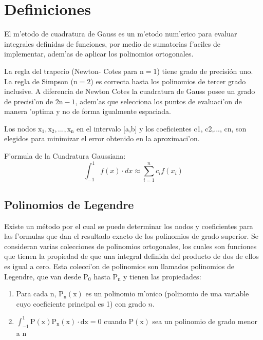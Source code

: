 \documentclass{article}
\begin{document}
		\section*{Definiciones}
			\large{
				El m'etodo de cuadratura de Gauss es un m'etodo num'erico para evaluar integrales definidas de funciones, por medio de sumatorias f'aciles de implementar, adem'as de aplicar los polinomios ortogonales.
				
				La regla del trapecio (Newton- Cotes para $\mathrm{n = 1}$) tiene grado de precisión uno. La regla de Simpson ($\mathrm{n = 2}$) es correcta hasta los polinomios de tercer grado inclusive. A diferencia de Newton Cotes la cuadratura de Gauss posee un grado de precisi'on de $\mathrm{2n-1}$, adem'as que selecciona los puntos de evaluaci'on de manera 'optima y no de forma igualmente espaciada.
				
				Los nodos $\mathrm{x_{1}, x_{2},..., x_{n}}$ en el intervalo [a,b] y los coeficientes c1, c2,..., cn, son elegidos para minimizar el error obtenido en la aproximaci'on.
				
				F'ormula de la Cuadratura Gaussiana: 
				\begin{equation}\label{eq:cuadGauss}
					\int_{-1}^{1} f(x) \cdot dx \approx \sum_{i=1}^{n} c_{i} f(x_{i})
				\end{equation}
				}

				\subsection*{Polinomios de Legendre}
				Existe un método por el cual se puede determinar los nodos y coeficientes  para las f'ormulas que dan el resultado exacto de los polinomios de grado superior. Se consideran varias colecciones de polinomios ortogonales, los cuales son funciones que tienen la propiedad de que una integral definida del producto de dos de ellos es igual a cero. Esta colecci'on de polinomios son llamados polinomios de Legendre, que van desde $\mathrm{P_{0}}$ hasta $\mathrm{P_{n}}$ y tienen las propiedades:
				\begin{enumerate}[1.]
					\item 
					Para cada $\mathrm{n}$, $\mathrm{P_{n}(x)}$ es un polinomio m'onico (polinomio de una variable cuyo coeficiente principal es 1) con grado $n$.
					\item
					$\mathrm{\int_{-1}^{1}P(x)P_{n}(x)\cdot dx = 0}$ cuando $\mathrm{P(x)}$ sea un polinomio de grado menor a $\mathrm{n}$
				\end{enumerate}
			
\end{document}
